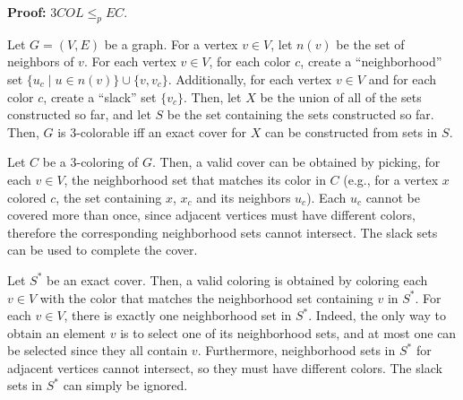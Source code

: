 \documentclass[12pt]{article}
\begin{document}
\textbf{Proof:} $3COL \le_p EC$.

Let $G = (V, E)$ be a graph. For a vertex $v \in V$, let $n(v)$ be the set of neighbors of $v$. For each vertex $v \in V$, for each color $c$, create a ``neighborhood'' set $\{u_{c} \mid u \in n(v)\} \cup \{v, v_c\}$. Additionally, for each vertex $v \in V$ and for each color $c$, create a ``slack'' set $\{v_c\}$. Then, let $X$ be the union of all of the sets constructed so far, and let $S$ be the set containing the sets constructed so far. Then, $G$ is 3-colorable iff an exact cover for $X$ can be constructed from sets in $S$.

Let $C$ be a 3-coloring of $G$. Then, a valid cover can be obtained by picking, for each $v \in V$, the neighborhood set that matches its color in $C$ (e.g., for a vertex $x$ colored $c$, the set containing $x$, $x_c$ and its neighbors $u_c$). Each $u_c$ cannot be covered more than once, since adjacent vertices must have different colors, therefore the corresponding neighborhood sets cannot intersect. The slack sets can be used to complete the cover.

Let $S^*$ be an exact cover. Then, a valid coloring is obtained by coloring each $v \in V$ with the color that matches the neighborhood set containing $v$ in $S^*$. For each $v \in V$, there is exactly one neighborhood set in $S^*$. Indeed, the only way to obtain an element $v$ is to select one of its neighborhood sets, and at most one can be selected since they all contain $v$. Furthermore, neighborhood sets in $S^*$ for adjacent vertices cannot intersect, so they must have different colors. The slack sets in $S^*$ can simply be ignored.
\end{document}
